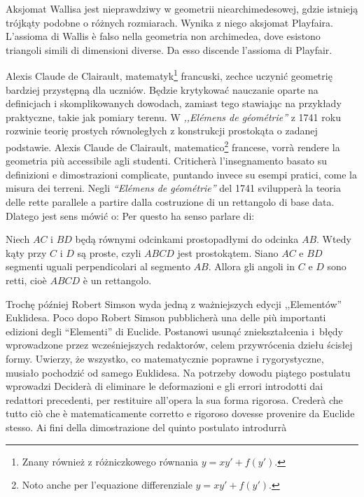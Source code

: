 Aksjomat Wallisa jest nieprawdziwy w geometrii niearchimedesowej, gdzie istnieją trójkąty podobne o różnych rozmiarach. %
Wynika z niego aksjomat Playfaira. %
L'assioma di Wallis è falso nella geometria non archimedea, dove esistono triangoli simili di dimensioni diverse. %
Da esso discende l'assioma di Playfair. %

Alexis Claude de Clairault, matematyk\footnote{Znany również z różniczkowego równania $y = x y' + f(y')$.} francuski, zechce uczynić geometrię bardziej przystępną dla uczniów. %
Będzie krytykować nauczanie oparte na definicjach i skomplikowanych dowodach, zamiast tego stawiając na przykłady praktyczne, takie jak pomiary terenu. %
W \emph{,,Elémens de géométrie''} z 1741 roku rozwinie teorię prostych równoległych z konstrukcji prostokąta o zadanej podstawie. %
Alexis Claude de Clairault, matematico\footnote{Noto anche per l'equazione differenziale $y = x y' + f(y')$.} francese, vorrà rendere la geometria più accessibile agli studenti. %
Criticherà l'insegnamento basato su definizioni e dimostrazioni complicate, puntando invece su esempi pratici, come la misura dei terreni. %
Negli \emph{``Elémens de géométrie''} del 1741 svilupperà la teoria delle rette parallele a partire dalla costruzione di un rettangolo di base data. %
Dlatego jest sens mówić o: %
Per questo ha senso parlare di: %

\begin{proposition}
[aksjomat Clairaulta] %
[assioma di Clairaut] %
	Niech $AC$ i $BD$ będą równymi odcinkami prostopadłymi do odcinka $AB$. %
	Wtedy kąty przy $C$ i $D$ są proste, czyli $ABCD$ jest prostokątem. %
	Siano $AC$ e $BD$ segmenti uguali perpendicolari al segmento $AB$. %
	Allora gli angoli in $C$ e $D$ sono retti, cioè $ABCD$ è un rettangolo. %
\end{proposition}

Trochę później Robert Simson wyda jedną z ważniejszych edycji ,,Elementów'' Euklidesa. %
Poco dopo Robert Simson pubblicherà una delle più importanti edizioni degli ``Elementi'' di Euclide. %
%
Postanowi usunąć zniekształcenia i~błędy wprowadzone przez wcześniejszych redaktorów, celem przywrócenia dziełu ścisłej formy. %
Uwierzy, że wszystko, co matematycznie poprawne i rygorystyczne, musiało pochodzić od samego Euklidesa. %
Na potrzeby dowodu piątego postulatu wprowadzi %
Deciderà di eliminare le deformazioni e gli errori introdotti dai redattori precedenti, per restituire all'opera la sua forma rigorosa. %
Crederà che tutto ciò che è matematicamente corretto e rigoroso dovesse provenire da Euclide stesso. %
Ai fini della dimostrazione del quinto postulato introdurrà %


